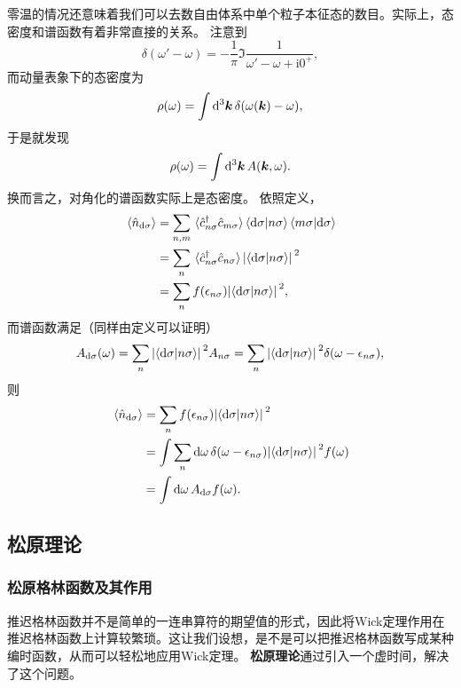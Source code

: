\documentclass[hyperref, UTF8, a4paper]{ctexart}
\newcommand*{\ii}{\mathrm{i}}
\begin{document}
零温的情况还意味着我们可以去数自由体系中单个粒子本征态的数目。实际上，态密度和谱函数有着非常直接的关系。
注意到
\[
    \delta(\omega' - \omega) = - \frac{1}{\pi} \Im \frac{1}{\omega' - \omega + \ii 0^+},
\]
而动量表象下的态密度为
\[
    \rho(\omega) = \int \dd[3]{\vb*{k}} \delta(\omega(\vb*{k}) - \omega),
\]
于是就发现
\begin{equation}
    \rho(\omega) = \int \dd[3]{\vb*{k}} A(\vb*{k}, \omega).
\end{equation}
换而言之，对角化的谱函数实际上是态密度。
依照定义，
\[
    \begin{aligned}
        \expval*{\hat{n}_{\text{d} \sigma}} &= \sum_{n, m} \expval*{\hat{c}^\dagger_{n \sigma} \hat{c}_{m \sigma}} \braket{\text{d} \sigma}{n \sigma} \braket{m \sigma}{\text{d} \sigma} \\
        &= \sum_{n} \expval*{\hat{c}^\dagger_{n \sigma} \hat{c}_{n \sigma}} \abs*{\braket{\text{d} \sigma}{n \sigma} }^2 \\
        &= \sum_{n} f(\epsilon_{n \sigma}) \abs*{\braket{\text{d} \sigma}{n \sigma} }^2, 
    \end{aligned}
\]
而谱函数满足（同样由定义可以证明）
\[
    A_{\text{d} \sigma}(\omega) = \sum_n \abs*{\braket{\text{d} \sigma}{n \sigma} }^2 A_{n \sigma} = \sum_n \abs*{\braket{\text{d} \sigma}{n \sigma} }^2 \delta(\omega - \epsilon_{n \sigma}),
\]
则
\[
    \begin{aligned}
        \expval*{\hat{n}_{\text{d} \sigma}} &= \sum_{n} f(\epsilon_{n \sigma}) \abs*{\braket{\text{d} \sigma}{n \sigma} }^2 \\
        &= \int \sum_{n} \dd{\omega} \delta(\omega - \epsilon_{n \sigma}) \abs*{\braket{\text{d} \sigma}{n \sigma} }^2 f(\omega) \\
        &= \int \dd{\omega} A_{\text{d} \sigma} f(\omega).
    \end{aligned}
\]

\subsection{松原理论}\label{sec:matsubara-theory}

\subsubsection{松原格林函数及其作用}

推迟格林函数并不是简单的一连串算符的期望值的形式，因此将Wick定理作用在推迟格林函数上计算较繁琐。这让我们设想，是不是可以把推迟格林函数写成某种编时函数，从而可以轻松地应用Wick定理。
\textbf{松原理论}通过引入一个虚时间，解决了这个问题。
\end{document}
